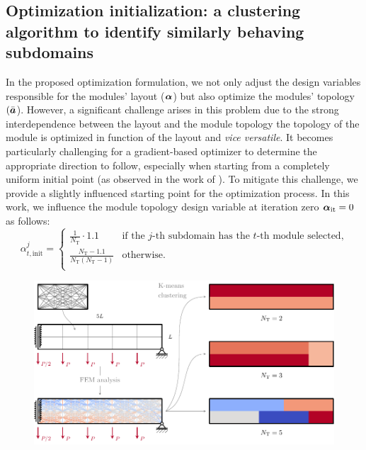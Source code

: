 \subsection{Optimization initialization: a clustering algorithm to identify similarly behaving subdomains}
In the proposed optimization formulation, we not only adjust the design variables responsible for the modules' layout ($\bm{\alpha}$) but also optimize the modules' topology $(\bar{\bm{a}}$). However, a significant challenge arises in this problem due to the strong interdependence between the layout and the module topology \ie the topology of the module is optimized in function of the layout and \textit{vice versatile}. It becomes particularly challenging for a gradient-based optimizer to determine the appropriate direction to follow, especially when starting from a completely uniform initial point (as observed in the work of ). To mitigate this challenge, we provide a slightly influenced starting point for the optimization process. In this work, we influence the module topology design variable at iteration zero $\bm{\alpha}_\text{it}=0$ as follows:
\begin{equation}
    \alpha_{t,\text{init}}^j =
    \begin{cases}
        \frac{1}{N_\text{T}} \cdot 1.1  & \text{if the $j$-th subdomain has the $t$-th module selected,}\\
        \frac{N_\text{T} - 1.1}{N_\text{T}(N_\text{T} - 1)} & \text{otherwise.} \\
    \end{cases}  
\end{equation}

\begin{figure}
    \centering
    \includegraphics{figures/06_DMO/00_stress_clustering/stress_clustering.pdf}
    \caption{}
    \label{fig:06_kmeans}
\end{figure}

